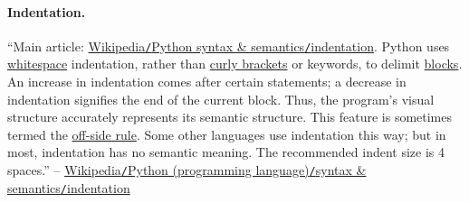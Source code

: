 \documentclass{article}
\numberwithin{equation}{section}
\begin{document}
\paragraph{Indentation.} ``Main article: \href{https://en.wikipedia.org/wiki/Python_syntax_and_semantics#Indentation}{Wikipedia\texttt{/}Python syntax \& semantics\texttt{/}indentation}. Python uses \href{https://en.wikipedia.org/wiki/Whitespace_character}{whitespace} indentation, rather than \href{https://en.wikipedia.org/wiki/Curly_bracket_programming_language}{curly brackets} or keywords, to delimit \href{https://en.wikipedia.org/wiki/Block_(programming)}{blocks}. An increase in indentation comes after certain statements; a decrease in indentation signifies the end of the current block. Thus, the program's visual structure accurately represents its semantic structure. This feature is sometimes termed the \href{https://en.wikipedia.org/wiki/Off-side_rule}{off-side rule}. Some other languages use indentation this way; but in most, indentation has no semantic meaning. The recommended indent size is 4 spaces.'' -- \href{https://en.wikipedia.org/wiki/Python_(programming_language)#Indentation}{Wikipedia\texttt{/}Python (programming language)\texttt{/}syntax \& semantics\texttt{/}indentation}
\end{document}
